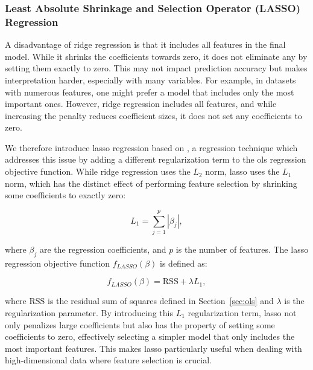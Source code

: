 \subsubsection{Least Absolute Shrinkage and Selection Operator (LASSO) Regression}
A disadvantage of ridge regression is that it includes all features in the final model.
While it shrinks the coefficients towards zero, it does not eliminate any by setting them exactly to zero.
This may not impact prediction accuracy but makes interpretation harder, especially with many variables.
For example, in datasets with numerous features, one might prefer a model that includes only the most important ones.
However, ridge regression includes all features, and while increasing the penalty reduces coefficient sizes, it does not set any coefficients to zero\cite{James2023AnIS}.

We therefore introduce \gls{lasso} regression based on \citet{James2023AnIS}, a regression technique which addresses this issue by adding a different regularization term to the \gls{ols} regression objective function.
While ridge regression uses the $L_2$ norm, \gls{lasso} uses the $L_1$ norm, which has the distinct effect of performing feature selection by shrinking some coefficients to exactly zero:

$$
L_1 = \sum_{j=1}^{p} |\beta_j|,
$$

where $\beta_j$ are the regression coefficients, and $p$ is the number of features.
The \gls{lasso} regression objective function $f_{LASSO}(\beta)$ is defined as:

$$
f_{LASSO}(\beta) = \text{RSS} + \lambda L_1,
$$

where $\text{RSS}$ is the residual sum of squares defined in Section~\ref{sec:ols} and $\lambda$ is the regularization parameter.
By introducing this $L_1$ regularization term, \gls{lasso} not only penalizes large coefficients but also has the property of setting some coefficients to zero, effectively selecting a simpler model that only includes the most important features.
This makes \gls{lasso} particularly useful when dealing with high-dimensional data where feature selection is crucial.